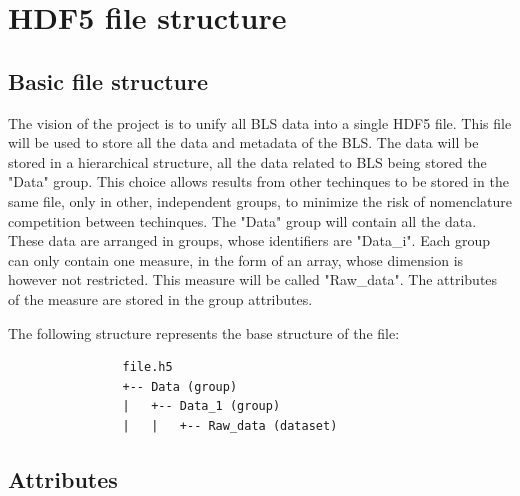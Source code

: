 \documentclass{book}
\begin{document}
    \section*{HDF5 file structure}

        \subsection*{Basic file structure}
            The vision of the project is to unify all BLS data into a single HDF5 file. This file will be used to store all the data and metadata of the BLS. The data will be stored in a hierarchical structure, all the data related to BLS being stored the "Data" group. This choice allows results from other techinques to be stored in the same file, only in other, independent groups, to minimize the risk of nomenclature competition between techinques. The "Data" group will contain all the data. These data are arranged in groups, whose identifiers are "Data\_i". Each group can only contain one measure, in the form of an array, whose dimension is however not restricted. This measure will be called "Raw\_data". The attributes of the measure are stored in the group attributes.

            The following structure represents the base structure of the file:

            \begin{verbatim}
                file.h5
                +-- Data (group)
                |   +-- Data_1 (group)
                |   |   +-- Raw_data (dataset)
            \end{verbatim}

        \subsection*{Attributes}
\end{document}
